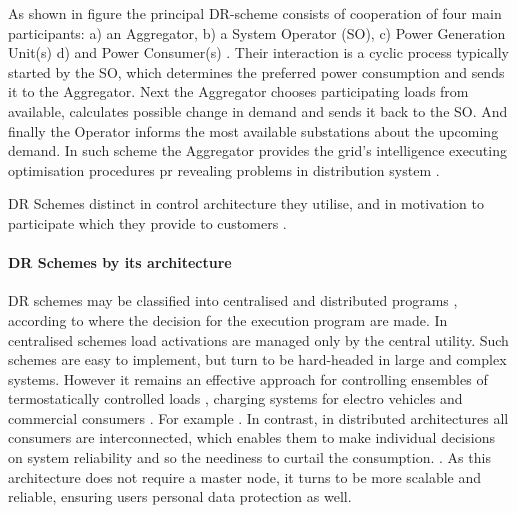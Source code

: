 As shown in figure  the principal DR-scheme consists of cooperation of four main participants: a) an Aggregator, b) a System Operator (SO), c) Power Generation Unit(s) d) and Power Consumer(s) \cite{Medina2010}. Their interaction is a cyclic process typically started by the SO, which determines the preferred power consumption and sends it to the Aggregator. Next the Aggregator chooses participating loads from available, calculates possible change in demand and sends it back to the SO. And finally the Operator informs the most available substations about the upcoming demand. In such scheme the Aggregator provides the grid's intelligence executing optimisation procedures pr revealing problems in distribution system \cite{Vardakas2015}. 

DR Schemes distinct in control architecture they utilise, and in motivation to participate which they provide to customers .

\paragraph{DR Schemes by its architecture} DR schemes may be classified into centralised and distributed programs \cite{Zhou2012}, according to where the decision for the execution program are made. In centralised schemes load activations are managed only by the central utility. Such schemes are easy to implement, but turn to be hard-headed in large and complex systems. However it remains an effective approach for controlling ensembles of termostatically controlled loads \cite{Hao2015}, charging systems for electro vehicles \cite{Yano2012} and commercial consumers \cite{Motegi2007}. For example . In contrast, in distributed architectures all consumers are interconnected, which enables them to make individual decisions on system reliability and so the neediness to curtail the consumption. \cite{Fan2011}. As this architecture does not require a master node, it turns to be more scalable and reliable, ensuring users personal data protection as well. 

